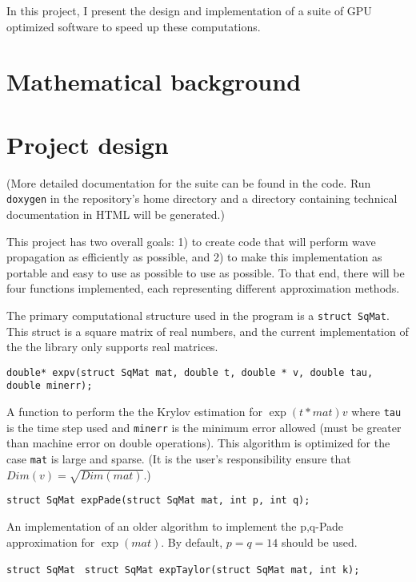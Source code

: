 \documentclass{article}
\theoremstyle{exampstyle} \newtheorem*{remark}{Remark}
\newcommand{\1}{\mathds{1}}
\begin{document}
In this project, I present the design and implementation of a suite of GPU optimized software to speed up these computations. %


\section{Mathematical background}


\section{Project design}

(More detailed documentation for the suite can be found in the code. Run \texttt{doxygen} in the repository's home directory and a directory containing technical documentation in HTML will be generated.)

This project has two overall goals: 1) to create code that will perform wave propagation as efficiently as possible, and 2) to make this implementation as portable and easy to use as possible to use as possible. To that end, there will be four functions implemented, each representing different approximation methods.

The primary computational structure used in the program is a \texttt{struct SqMat}. This struct is a square matrix of real numbers, and the current implementation of the the library only supports real matrices. 
\newline

\texttt{double* expv(struct SqMat mat, double t, double * v, double tau, double minerr);}

A function to perform the the Krylov estimation for $\exp(t*mat)v$ where \texttt{tau} is the time step used and \texttt{minerr} is the minimum error allowed (must be greater than machine error on double operations). This algorithm is optimized for the case \texttt{mat} is large and sparse. (It is the user's responsibility ensure that $Dim(v)=\sqrt{Dim(mat)}$.)  
\newline

\texttt{struct SqMat expPade(struct SqMat mat, int p, int q);}

An implementation of an older algorithm to implement the p,q-Pade approximation for $\exp(mat)$. By default, $p=q=14$ should be used.  
\newline

\texttt{struct SqMat }
\texttt{struct SqMat expTaylor(struct SqMat mat, int k);}
\end{document}

